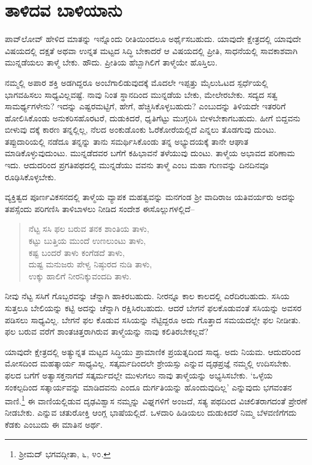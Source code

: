 \section*{ತಾಳಿದವ ಬಾಳಿಯಾನು}

\vskip -6pt

ಪಾವ್​ಲೋವ್ ಹೇಳಿದ ಮಾತನ್ನು ಇನ್ನೊಂದು ರೀತಿಯಿಂದಲೂ ಅರ್ಥೈಸಬಹುದು. ಯಾವುದೇ ಕ್ಷೇತ್ರದಲ್ಲಿ ಯಾವುದೇ ವಿಷಯದಲ್ಲಿ ದಕ್ಷತೆ ಅಥವಾ ಉನ್ನತ ಮಟ್ಟದ ಸಿದ್ಧಿ ಬೇಕಾದರೆ ಆ ವಿಷಯದಲ್ಲಿ ಪ್ರೀತಿ, ಸಾಧನೆಯಲ್ಲಿ ಸಾವಕಾಶವಾಗಿ ಮುನ್ನಡೆಯಲು ತಾಳ್ಮೆ ಬೇಕು. ಹೌದು. ಪ್ರೀತಿಯ ಹೆಬ್ಬಾಗಿಲಿಗೆ ತಾಳ್ಮೆಯೇ ಹೊಸ್ತಿಲು.

ನಮ್ಮಲ್ಲಿ ಅಪಾರ ಶಕ್ತಿ ಅಡಗಿದ್ದರೂ ಅಂಬೆಗಾಲಿಡುವುದಕ್ಕೆ ಮೊದಲೇ ಇಪ್ಪತ್ತು ಮೈಲು\break ಓಟದ ಸ್ಪರ್ಧೆಯಲ್ಲಿ ಭಾಗವಹಿಸಲು ಸಾಧ್ಯವಿಲ್ಲವಷ್ಟೆ. ನಾವು ನಿಂತ ಸ್ಥಾನದಿಂದ ಮುನ್ನಡೆಯ ಬೇಕು, ಮೇಲೇರಬೇಕು. ಸದ್ಯದ ಸತ್ವ ಸಾಮರ್ಥ್ಯಗಳೇನು? ಇದನ್ನು ಎಷ್ಟರಮಟ್ಟಿಗೆ, ಹೇಗೆ, ಹೆಚ್ಚಿಸಿಕೊಳ್ಳಬಹುದು? ಎಂಬುದನ್ನು ತಿಳಿಯದೇ ಇತರರಿಗೆ ಹೋಲಿಸಿಕೊಂಡು ಅನುಕರಿಸ\-ಹೊರಟರೆ, ದುಡುಕಿದರೆ, ಧೃತಿಗೆಟ್ಟು ಮುಗ್ಗರಿಸಿ ಬೀಳಬೇಕಾಗಬಹುದು. ಹೀಗೆ ಬಿದ್ದವನು ಬೀಳುವು ದಕ್ಕೆ ಕಾರಣ ತನ್ನಲ್ಲಿಲ್ಲ, ನೆಲದ ಅಂಕುಡೊಂಕು ಓರೆಕೋರೆಯಲ್ಲಿದೆ ಎನ್ನಲು ತೊಡಗುವು ದುಂಟು. ತಪ್ಪುದಾರಿಯಲ್ಲಿ ನಡೆದೂ ತನ್ನನ್ನು ತಾನು ಸಮರ್ಥಿಸಿಕೊಂಡು ತನ್ನ ಅಭ್ಯುದಯಕ್ಕೆ ತಾನೇ ಆಘಾತ ಮಾಡಿಕೊಳ್ಳುವುದುಂಟು. ಮುನ್ನಡೆದವರ ಬಗೆಗೆ ಕಹಿಭಾವನೆ ತಳೆಯುವು ದುಂಟು. ತಾಳ್ಮೆಯ ಅಭಾವದ ಪರಿಣಾಮ ಇದು. ಆದುದರಿಂದ ಪ್ರಗತಿಪಥದಲ್ಲಿ ಮುನ್ನಡೆಯು ವವನು ತಾಳ್ಮೆ ಎಂಬ ಮಹಾ ಗುಣವನ್ನು ದಿನದಿನವೂ ರೂಢಿಸಿಕೊಳ್ಳಬೇಕು.

ವ್ಯಕ್ತಿತ್ವದ ಪೂರ್ಣವಿಕಸನದಲ್ಲಿ ತಾಳ್ಮೆಯ ವ್ಯಾಪಕ ಮಹತ್ವವನ್ನು ಮನಗಂಡ ಶ‍್ರೀ ವಾದಿರಾಜ ಯತಿವರ್ಯರು ಅದನ್ನು ತಪಸ್ಸೆಂದು ಪರಿಗಣಿಸಿ ತಾಳಿಬಾಳಲು ನೀಡಿದ ಸಂದೇಶ ಈ\break ಸೊಲ್ಲುಗಳಲ್ಲಿದೆ–

\begin{verse}
ನೆಟ್ಟ ಸಸಿ ಫಲ ಬರುವ ತನಕ ಶಾಂತಿಯ ತಾಳು,\\ಕಟ್ಟು ಬುತ್ತಿಯ ಮುಂದೆ ಉಣಲುಂಟು ತಾಳು,\\ಕಷ್ಟ ಬಂದರೆ ತಾಳು ಕಂಗೆಡದೆ ತಾಳು,\\ದುಷ್ಟ ಮನುಜರು ಪೇಳ್ವ ನಿಷ್ಠುರದ ನುಡಿ ತಾಳು,\\ಉಕ್ಕು ಹಾಲಿಗೆ ನೀರನಿಕ್ಕುವಂದದಿ ತಾಳು.
\end{verse}

ನೀವು ನೆಟ್ಟ ಸಸಿಗೆ ಗೊಬ್ಬರವನ್ನು ಚೆನ್ನಾಗಿ ಹಾಕಿರಬಹುದು. ನೀರನ್ನೂ ಕಾಲ ಕಾಲದಲ್ಲಿ ಎರೆದಿರಬಹುದು. ಸಸಿಯ ಸುತ್ತಲೂ ಬೇಲಿಯನ್ನು ಕಟ್ಟಿ ಅದನ್ನು ಚೆನ್ನಾಗಿ ರಕ್ಷಿಸಿರಬಹುದು. ಆದರೆ ಬೇಗನೆ ಫಲಕೊಡುವಂತೆ ಸಸಿಯನ್ನು ಅವಸರ ಪಡಿಸಲು ಸಾಧ್ಯವಿಲ್ಲ. ಬೇಗನೆ ಫಲ ಕೊಡುವ ಸಸಿಯನ್ನು ನೆಟ್ಟಿದ್ದರೂ ಅದು ಗೊತ್ತಾದ ಸಮಯದಲ್ಲೇ ಫಲ ನೀಡೀತು. ಫಲ ಬರುವ ವರೆಗೆ ಶಾಂತಚಿತ್ತರಾಗಿರುವ ತಾಳ್ಮೆಯನ್ನು ನಾವು ಕಲಿತಿರಬೇಕಲ್ಲವೆ?

ಯಾವುದೇ ಕ್ಷೇತ್ರದಲ್ಲಿ ಅತ್ಯುನ್ನತ ಮಟ್ಟದ ಸಿದ್ಧಿಯು ಪ್ರಾಮಾಣಿಕ ಪ್ರಯತ್ನದಿಂದ ಸಾಧ್ಯ. ಅದು ನಿಯಮ. ಆದುದರಿಂದ ಮೋಸದಿಂದ ಮಹತ್ಕಾರ್ಯ ಸಾಧ್ಯವಿಲ್ಲ. ಸತ್ಕರ್ಮದಿಂದಲೇ ಶ್ರೇಯಸ್ಸು ಎನ್ನುವ ದೃಢಪ್ರಜ್ಞೆ ನಮ್ಮಲ್ಲಿ ಉದಿಸಬೇಕು. ಫಲದ ಬಗೆಗೆ ಅತ್ಯಾಸಕ್ತನಾಗದೆ ಸತ್ಕರ್ಮದಲ್ಲೇ ಮುಳುಗಲು ನಾವು ತಾಳ್ಮೆಯನ್ನು ಅಭ್ಯಸಿಸಬೇಕು. ‘ಒಳ್ಳೆಯ ಸಂಕಲ್ಪದಿಂದ ಸತ್ಕಾರ್ಯವನ್ನು ಮಾಡಿದವನು ಎಂದೂ ದುರ್ಗತಿಯನ್ನು ಹೊಂದುವುದಿಲ್ಲ’ ಎನ್ನುವುದು ಭಗವಂತನ ವಾಣಿ.\footnote{ ಶ‍್ರೀಮದ್ ಭಗವದ್ಗೀತಾ, ೬, ೪೦.} ಈ ವಾಣಿಯಲ್ಲಿಡುವ ದೃಢವಿಶ್ವಾಸ ನಮ್ಮನ್ನು ವಿಘ್ನಗಳಿಗೆ ಅಂಜದೆ, ಸತ್ಯ ಪಥದಿಂದ ವಿಚಲಿತರಾಗದಂತೆ ಪ್ರೇರಣೆ ನೀಡಬೇಕು.  ಎನ್ನುವ ಚತುರೋಕ್ತಿ ಆಂಗ್ಲ ಭಾಷೆಯಲ್ಲಿದೆ. ಒಳದಾರಿ ಹಿಡಿಯಲು ದುಡುಕಿದರೆ ನಿಮ್ಮ ಬೆಳವಣಿಗೆಗದು ಕೆಡಕು ಎಂಬುದು ಈ ಮಾತಿನ ಅರ್ಥ.


